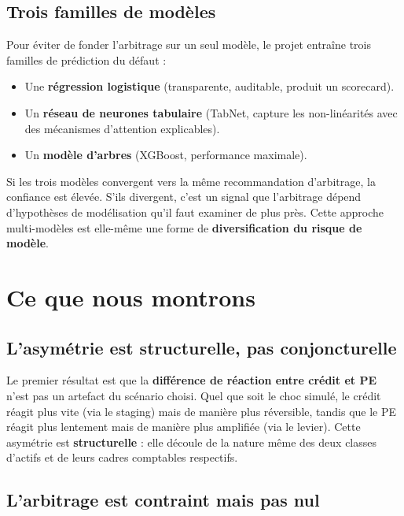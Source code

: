 \documentclass[12pt,a4paper]{article}
\begin{document}
\subsection{Trois familles de modèles}

Pour éviter de fonder l'arbitrage sur un seul modèle, le projet entraîne trois familles de prédiction du défaut :

\begin{itemize}
  \item Une \textbf{régression logistique} (transparente, auditable, produit un scorecard).
  \item Un \textbf{réseau de neurones tabulaire} (TabNet, capture les non-linéarités avec des mécanismes d'attention explicables).
  \item Un \textbf{modèle d'arbres} (XGBoost, performance maximale).
\end{itemize}

Si les trois modèles convergent vers la même recommandation d'arbitrage, la confiance est élevée. S'ils divergent, c'est un signal que l'arbitrage dépend d'hypothèses de modélisation qu'il faut examiner de plus près. Cette approche multi-modèles est elle-même une forme de \textbf{diversification du risque de modèle}.

\section{Ce que nous montrons}

\subsection{L'asymétrie est structurelle, pas conjoncturelle}

Le premier résultat est que la \textbf{différence de réaction entre crédit et PE} n'est pas un artefact du scénario choisi. Quel que soit le choc simulé, le crédit réagit plus vite (via le staging) mais de manière plus réversible, tandis que le PE réagit plus lentement mais de manière plus amplifiée (via le levier). Cette asymétrie est \textbf{structurelle} : elle découle de la nature même des deux classes d'actifs et de leurs cadres comptables respectifs.

\subsection{L'arbitrage est contraint mais pas nul}
\end{document}
